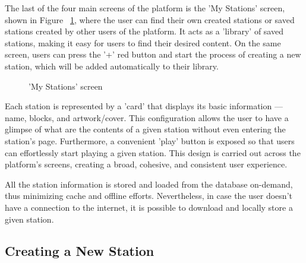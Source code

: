 The last of the four main screens of the platform is the 'My Stations' screen, shown in Figure ~\ref{fig:mys}, where the user can find their own created stations or saved stations created by other users of the platform. It acts as a 'library' of saved stations, making it easy for users to find their desired content. On the same screen, users can press the '+' red button and start the process of creating a new station, which will be added automatically to their library.

\begin{figure}[h]
\centering
{}
\caption{'My Stations' screen}
\label{fig:mys}
\end{figure}

Each station is represented by a 'card' that displays its basic information — name, blocks, and artwork/cover. This configuration allows the user to have a glimpse of what are the contents of a given station without even entering the station's page. Furthermore, a convenient 'play' button is exposed so that users can effortlessly start playing a given station. This design is carried out across the platform's screens, creating a broad, cohesive, and consistent user experience.

All the station information is stored and loaded from the database on-demand, thus minimizing cache and offline efforts. Nevertheless, in case the user doesn't have a connection to the internet, it is possible to download and locally store a given station.


\newpage
\subsection{Creating a New Station}


